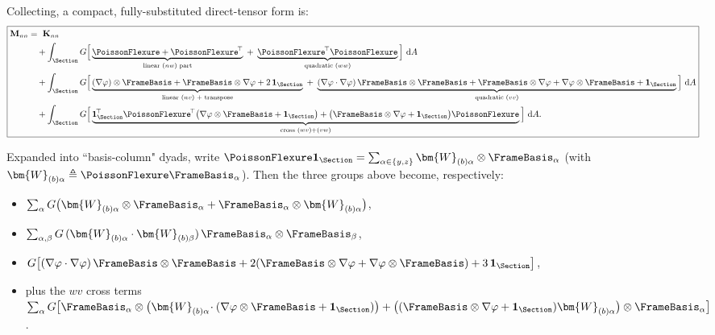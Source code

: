 Collecting, a compact, fully-substituted direct-tensor form is:
\[
\boxed{
\begin{aligned}
\mathbf{M}_{nn}
&=\ \mathbf{K}_{nn}
\\
&\quad +\int_{\Section} G\Big[
\underbrace{\PoissonFlexure+\PoissonFlexure^{\!\top}}_{\text{linear }(nw)\text{ part}}
\;+\;\underbrace{\PoissonFlexure^{\!\top}\PoissonFlexure}_{\text{quadratic }(ww)}
\Big]\mathrm{~d}A
\\
&\quad +\int_{\Section} G\Big[
\underbrace{(\nabla\varphi)\otimes\FrameBasis+\FrameBasis\otimes\nabla\varphi+2\,\mathbf{1}_{\Section}}_{\text{linear }(nv)\text{ + transpose}}
\;+\;\underbrace{(\nabla\varphi\cdot\nabla\varphi)\,\FrameBasis\otimes\FrameBasis+\FrameBasis\otimes\nabla\varphi+\nabla\varphi\otimes\FrameBasis+\mathbf{1}_{\Section}}_{\text{quadratic }(vv)}
\Big]\mathrm{~d}A
\\
&\quad +\int_{\Section} G\Big[
\underbrace{\mathbf{1}_{\Section}^{\!\top}\PoissonFlexure^{\!\top}\big(\nabla\varphi\otimes\FrameBasis+\mathbf{1}_{\Section}\big)
+\big(\FrameBasis\otimes\nabla\varphi+\mathbf{1}_{\Section}\big)\PoissonFlexure}_{\text{cross }(wv)+(vw)}
\Big]\mathrm{~d}A.
\end{aligned}}
\]

Expanded into ``basis-column" dyads, write \(\PoissonFlexure\mathbf{1}_{\Section}=\sum_{\alpha\in\{y,z\}}{\bm{W}_{(b)\alpha}}\otimes\FrameBasis_\alpha\) (with \({\bm{W}_{(b)\alpha}}\triangleq \PoissonFlexure\FrameBasis_\alpha\)). 
Then the three groups above become, respectively:
\begin{itemize}
  \item \( \sum_\alpha G\big({\bm{W}_{(b)\alpha}}\otimes\FrameBasis_\alpha+\FrameBasis_\alpha\otimes{\bm{W}_{(b)\alpha}}\big)\),
  \item \( \sum_{\alpha,\beta} G\,({\bm{W}_{(b)\alpha}}\cdot\bm{W}_{(b)\beta})\,\FrameBasis_\alpha\otimes\FrameBasis_\beta\),
  \item \( G\big[(\nabla\varphi\cdot\nabla\varphi)\,\FrameBasis\otimes\FrameBasis+2(\FrameBasis\otimes\nabla\varphi+\nabla\varphi\otimes\FrameBasis)+3\,\mathbf{1}_{\Section}\big]\),
  \item plus the \(wv\) cross terms
  \(\sum_\alpha G\big[\FrameBasis_\alpha\otimes\big({\bm{W}_{(b)\alpha}}\!\cdot(\nabla\varphi\otimes\FrameBasis+\mathbf{1}_{\Section})\big)
  +\big((\FrameBasis\otimes\nabla\varphi+\mathbf{1}_{\Section}){\bm{W}_{(b)\alpha}}\big)\otimes\FrameBasis_\alpha\big]\).
\end{itemize}


